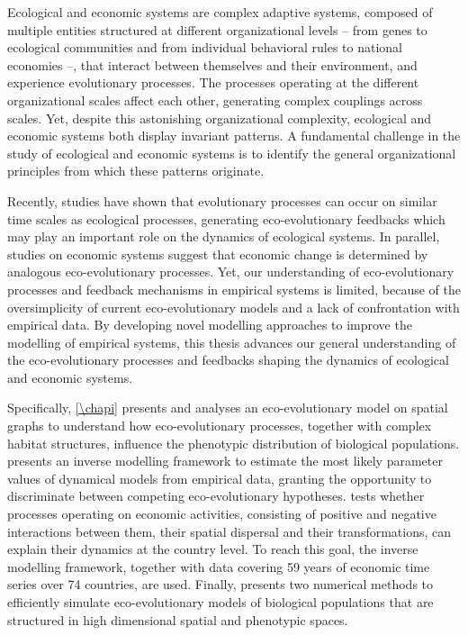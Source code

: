 %
\label{sec:summary}
\small{
    Ecological and economic systems are complex adaptive systems, composed of multiple entities structured at different organizational levels -- from genes to ecological communities and from individual behavioral rules to national economies --, that interact between themselves and their environment, and experience evolutionary processes. The processes operating at the different organizational scales affect each other, generating complex couplings across scales. Yet, despite this astonishing organizational complexity, ecological and economic systems both display invariant patterns. A fundamental challenge in the study of ecological and economic systems is to identify the general organizational principles from which these patterns originate.

    Recently, studies have shown that evolutionary processes can occur on similar time scales as ecological processes, generating eco-evolutionary feedbacks which may play an important role on the dynamics of ecological systems. In parallel, studies on economic systems suggest that economic change is determined by analogous eco-evolutionary processes. Yet, our understanding of eco-evolutionary processes and feedback mechanisms in empirical systems is limited, because of the oversimplicity of current eco-evolutionary models and a lack of confrontation with empirical data. By developing novel modelling approaches to improve the modelling of empirical systems, this thesis advances our general understanding of the eco-evolutionary processes and feedbacks shaping the dynamics of ecological and economic systems.
    
    Specifically, \cref{\chapi} presents and analyses an eco-evolutionary model on spatial graphs to understand how eco-evolutionary processes, together with complex habitat structures, influence the phenotypic distribution of biological populations. \Cref{\chapii} presents an inverse modelling framework to estimate the most likely parameter values of dynamical models from empirical data, granting the opportunity to discriminate between competing eco-evolutionary hypotheses. \Cref{\chapiii} tests whether processes operating on economic activities, consisting of positive and negative interactions between them, their spatial dispersal and their transformations, can explain their dynamics at the country level. To reach this goal, the inverse modelling framework, together with data covering 59 years of economic time series over 74 countries, are used. Finally, \Cref{\chapiv} presents two numerical methods to efficiently simulate eco-evolutionary models of biological populations that are structured in high dimensional spatial and phenotypic spaces.
    
}
